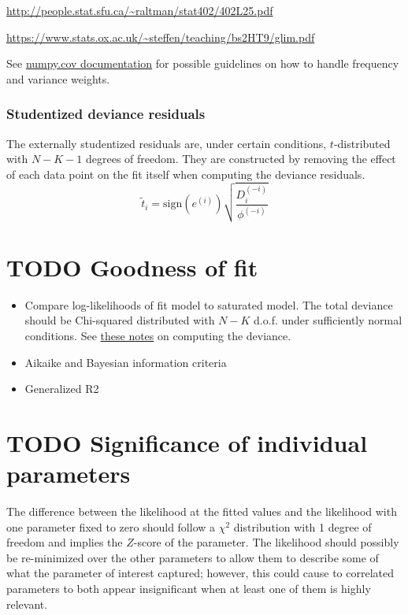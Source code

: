 \documentclass{article}
\begin{document}
\url{http://people.stat.sfu.ca/~raltman/stat402/402L25.pdf}

\url{https://www.stats.ox.ac.uk/~steffen/teaching/bs2HT9/glim.pdf}

See
\href{https://numpy.org/doc/stable/reference/generated/numpy.cov.html#numpy.cov}{numpy.cov
documentation} for possible guidelines on how to handle frequency and variance
weights.

\subsubsection{Studentized deviance residuals}
The externally studentized residuals are, under certain conditions,
$t$-distributed with $N-K-1$ degrees of freedom. They are constructed by
removing the effect of each data point on the fit itself when computing the
deviance residuals.
\[\tilde{t}_i = \mathrm{sign}(e^{(i)}) \sqrt{\frac{D_i^{(-i)}}{\phi^{(-i)}}} \]

\section{TODO Goodness of fit}

\begin{itemize}
\item Compare log-likelihoods of fit model to saturated model. The total
  deviance should be Chi-squared distributed with \(N -K\) d.o.f. under
  sufficiently normal conditions.
See \href{http://people.stat.sfu.ca/~raltman/stat402/402L11.pdf}{these notes} on computing the deviance.
\item Aikaike and Bayesian information criteria
\item Generalized R2
\end{itemize}

\section{TODO Significance of individual parameters}

The difference between the likelihood at the fitted values and the likelihood
with one parameter fixed to zero should follow a \(\chi^2\) distribution with
1 degree of freedom and implies the \(Z\)-score of the parameter. The
likelihood should possibly be re-minimized over the other parameters to allow
them to describe some of what the parameter of interest captured; however, this
could cause to correlated parameters to both appear insignificant when at least
one of them is highly relevant.
\end{document}
